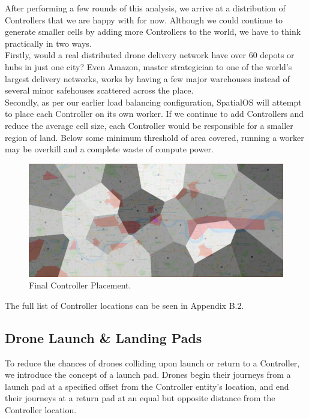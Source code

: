 \documentclass[a4paper,11pt,titlepage]{report}
\begin{document}
\clearpage
After performing a few rounds of this analysis, we arrive at a distribution of Controllers that we are happy with for now. Although we could continue to generate smaller cells by adding more Controllers to the world, we have to think practically in two ways.\\

Firstly, would a real distributed drone delivery network have over 60 depots or hubs in just one city? Even Amazon, master strategician to one of the world's largest delivery networks, works by having a few major warehouses instead of several minor safehouses scattered across the place.\\

Secondly, as per our earlier load balancing configuration, SpatialOS will attempt to place each Controller on its own worker. If we continue to add Controllers and reduce the average cell size, each Controller would be responsible for a smaller region of land. Below some minimum threshold of area covered, running a worker may be overkill and a complete waste of compute power.

\begin{figure}[!hbpt]
  \center
  \includegraphics[width=\linewidth]{img/may_03_4.png}
  \caption{Final Controller Placement.}
  \label{fig:may_03_4}
\end{figure}

The full list of Controller locations can be seen in Appendix B.2.

\clearpage
\subsection{Drone Launch \& Landing Pads}
To reduce the chances of drones colliding upon launch or return to a Controller, we introduce the concept of a launch pad. Drones begin their journeys from a launch pad at a specified offset from the Controller entity's location, and end their journeys at a return pad at an equal but opposite distance from the Controller location.
\end{document}
